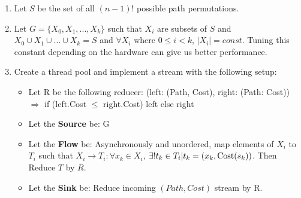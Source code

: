 \documentclass[11pt]{article}
\begin{document}
\begin{enumerate}
\item Let $S$ be the set of all $(n-1)!$ possible path permutations.
\item Let $G = \{X_0, X_1, ..., X_k\} $ such that $X_i$ are subsets of $S$ and $X_0 \cup X_1 \cup ... \cup X_k = S$ and $\forall X_i$ where $ 0 \leq i< k$, $\left | X_i \right | = const.$ Tuning this constant depending on the hardware can give us better performance.
\item Create a thread pool and implement a stream with the following setup:
\begin{itemize}
\item Let R be the following reducer: (left: (Path, Cost), right: (Path: Cost)) $\Rightarrow$ if (left.Cost $\leq$ right.Cost) left else right
\item Let the \textbf{Source} be: G
\item Let the \textbf{Flow} be: Asynchronously and unordered, map elements of $X_i$  to $T_i$ such that $ X_i \rightarrow T_i: \forall x_k \in X_i $, $ \exists! t_k\in T_i|t_k =(x_k, \textup{Cost}(s_k))$. Then Reduce $T$ by $R$.
\item Let the \textbf{Sink} be: Reduce incoming $(Path, Cost)$ stream by R.
\end{itemize}
\end{enumerate}
\end{document}
